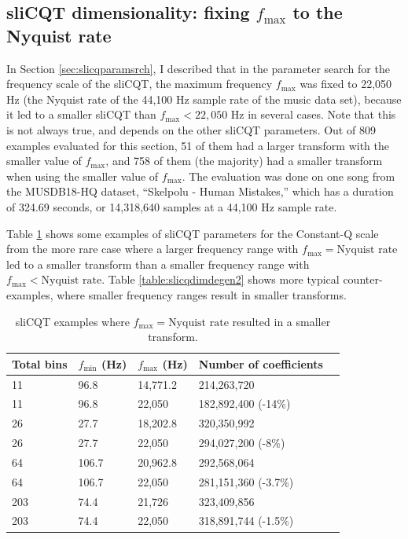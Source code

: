 \documentclass[report.tex]{subfiles}
\begin{document}
\begin{appendices}
\newpagefill

\section{sliCQT dimensionality: fixing $f_{\text{max}}$ to the Nyquist rate}
\label{appendix:slicqdim1}

In Section \ref{sec:slicqparamsrch}, I described that in the parameter search for the frequency scale of the sliCQT, the maximum frequency $f_{\text{max}}$ was fixed to 22,050 Hz (the Nyquist rate of the 44,100 Hz sample rate of the music data set), because it led to a smaller sliCQT than $f_{\text{max}} < 22,050 \text{ Hz}$ in several cases. Note that this is not always true, and depends on the other sliCQT parameters. Out of 809 examples evaluated for this section, 51 of them had a larger transform with the smaller value of $f_{\text{max}}$, and 758 of them (the majority) had a smaller transform when using the smaller value of $f_{\text{max}}$. The evaluation was done on one song from the MUSDB18-HQ dataset, ``Skelpolu - Human Mistakes,'' which has a duration of 324.69 seconds, or 14,318,640 samples at a 44,100 Hz sample rate.

Table \ref{table:slicqdimdegen1} shows some examples of sliCQT parameters for the Constant-Q scale from the more rare case where a larger frequency range with $f_{\text{max}} = \text{Nyquist rate}$ led to a smaller transform than a smaller frequency range with $f_{\text{max}} < \text{Nyquist rate}$. Table \ref{table:slicqdimdegen2} shows more typical counter-examples, where smaller frequency ranges result in smaller transforms.

\begin{table}[ht]
	\centering
	\caption{sliCQT examples where $f_{\text{max}} = \text{Nyquist rate}$ resulted in a smaller transform.}
	\label{table:slicqdimdegen1}
\begin{tabular}{ |l|l|l|l|l| }
	 \hline
	 Total bins & $f_{\text{min}}$ (Hz) & $f_{\text{max}}$ (Hz) & Number of coefficients \\
	 \hline
	 \hline
	 11 & 96.8 & 14,771.2 & 214,263,720 \\
	 \hline
	 11 & 96.8 & 22,050 & 182,892,400 (-14\%) \\
	 \hline
	 \hline
	 26 & 27.7 & 18,202.8 & 320,350,992 \\
	 \hline
	 26 & 27.7 & 22,050 & 294,027,200 (-8\%) \\
	 \hline
	 \hline
	 64 & 106.7 & 20,962.8 & 292,568,064 \\
	 \hline
	 64 & 106.7 & 22,050 & 281,151,360 (-3.7\%) \\
	 \hline
	 \hline
	 203 & 74.4 & 21,726 & 323,409,856 \\
	 \hline
	 203 & 74.4 & 22,050 & 318,891,744 (-1.5\%) \\
	 \hline
\end{tabular}
\end{table}


\end{appendices}
\end{document}
